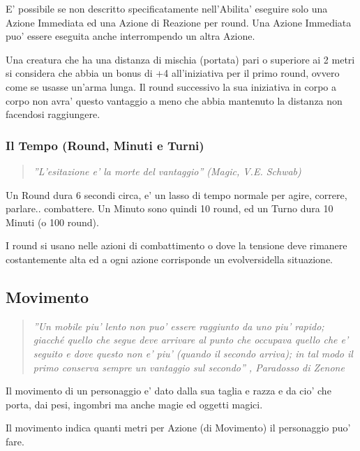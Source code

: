 \documentclass[a4paper,11pt,twoside,openany]{book}
\begin{document}
	E' possibile se non descritto specificatamente nell'Abilita' eseguire solo una Azione Immediata ed una Azione di Reazione per round. Una Azione Immediata puo' essere eseguita anche interrompendo un altra Azione.
	
	Una creatura che ha una distanza di mischia (portata) pari o superiore
	ai 2 metri si considera che abbia un bonus di +4 all'iniziativa per
	il primo round, ovvero come se usasse un'arma lunga. Il round successivo
	la sua iniziativa in corpo a corpo non avra' questo vantaggio a meno
	che abbia mantenuto la distanza non facendosi raggiungere.
	
	\subsubsection{Il Tempo (Round, Minuti e Turni)}
	
	\label{il-tempo-round-minuti-e-turni}
	\begin{quote}\textit{
			''L'esitazione e' la morte del vantaggio'' (Magic, V.E. Schwab)}\end{quote}
	
	Un Round dura 6 secondi circa, e' un lasso di tempo normale per agire, correre, parlare.. combattere. Un Minuto sono quindi 10 round, ed un Turno dura 10 Minuti (o 100 round).
	
	I round si usano nelle azioni di combattimento o dove la tensione deve rimanere costantemente alta ed a ogni azione corrisponde un evolversidella situazione.
	
	\pagebreak
	
	\subsection{Movimento}
	
	\label{movimento}
	
	\begin{quote}\textit{''Un mobile piu' lento non puo' essere raggiunto da uno piu' rapido; giacché quello che segue deve arrivare al punto che occupava quello che e' seguito e dove questo non e' piu' (quando il secondo arriva); in tal modo il primo conserva sempre un vantaggio sul secondo'' , Paradosso di Zenone
	}\end{quote}
	
	Il movimento di un personaggio e' dato dalla sua taglia e razza e da cio' che porta, dai pesi, ingombri ma anche magie ed oggetti magici.
	
	Il movimento indica quanti metri per Azione (di Movimento) il personaggio puo' fare.
	
\end{document}
